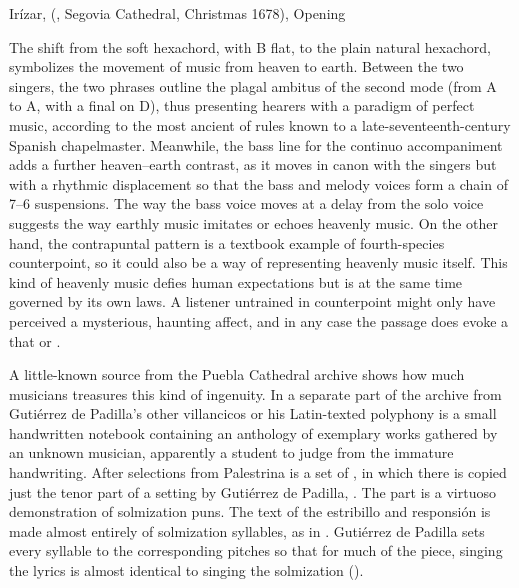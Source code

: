 {Irízar,  (, Segovia Cathedral,
Christmas 1678), Opening}

The shift from the  soft hexachord, with B flat, to the plain
natural hexachord, symbolizes the movement of music from heaven to earth.
Between the two singers, the two phrases outline the plagal ambitus of the
second mode (from A to A, with a final on D), thus presenting hearers with a
paradigm of perfect music, according to the most ancient of rules known to a
late-seventeenth-century Spanish chapelmaster.
Meanwhile, the bass line for the continuo accompaniment adds a further
heaven--earth contrast, as it moves in canon with the singers but with a
rhythmic displacement so that the bass and melody voices form a chain of 7--6
suspensions.
The way the bass voice moves at a delay from the solo voice suggests the way
earthly music imitates or echoes heavenly music.
On the other hand, the contrapuntal pattern is a textbook example of
fourth-species counterpoint, so it could also be a way of representing heavenly
music itself.  
This kind of heavenly music defies human expectations but is at the same time
governed by its own laws.
A listener untrained in counterpoint might only have perceived a mysterious,
haunting affect, and in any case the passage does evoke a  that  or .

A little-known source from the Puebla Cathedral archive shows how much
musicians treasures this kind of ingenuity.
In a separate part of the archive from Gutiérrez de Padilla's other villancicos
or his Latin-texted polyphony is a small handwritten notebook containing an
anthology of exemplary works gathered by an unknown musician, apparently a
student to judge from the immature handwriting.
After selections from Palestrina is a set of , in which there is copied just the tenor part of a setting by
Gutiérrez de Padilla, .
The part is a virtuoso demonstration of solmization puns.
The text of the estribillo and responsión is made almost entirely of
solmization syllables, as in .
Gutiérrez de Padilla sets every syllable to the corresponding pitches so that
for much of the piece, singing the lyrics is almost identical to singing the
solmization ().

